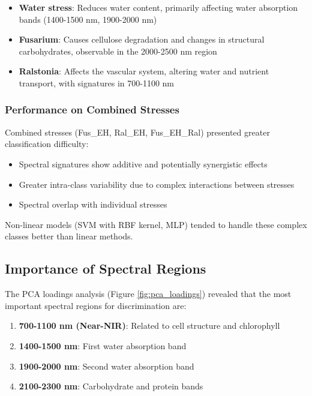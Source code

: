 \documentclass[12pt,a4paper]{article}
\begin{document}
\begin{itemize}
    \item \textbf{Water stress}: Reduces water content, primarily affecting water absorption bands (1400-1500 nm, 1900-2000 nm)
    \item \textbf{Fusarium}: Causes cellulose degradation and changes in structural carbohydrates, observable in the 2000-2500 nm region
    \item \textbf{Ralstonia}: Affects the vascular system, altering water and nutrient transport, with signatures in 700-1100 nm
\end{itemize}

\subsubsection{Performance on Combined Stresses}

Combined stresses (Fus\_EH, Ral\_EH, Fus\_EH\_Ral) presented greater classification difficulty:

\begin{itemize}
    \item Spectral signatures show additive and potentially synergistic effects
    \item Greater intra-class variability due to complex interactions between stresses
    \item Spectral overlap with individual stresses
\end{itemize}

Non-linear models (SVM with RBF kernel, MLP) tended to handle these complex classes better than linear methods.

\subsection{Importance of Spectral Regions}

The PCA loadings analysis (Figure \ref{fig:pca_loadings}) revealed that the most important spectral regions for discrimination are:

\begin{enumerate}
    \item \textbf{700-1100 nm (Near-NIR)}: Related to cell structure and chlorophyll
    \item \textbf{1400-1500 nm}: First water absorption band
    \item \textbf{1900-2000 nm}: Second water absorption band
    \item \textbf{2100-2300 nm}: Carbohydrate and protein bands
\end{enumerate}
\end{document}
